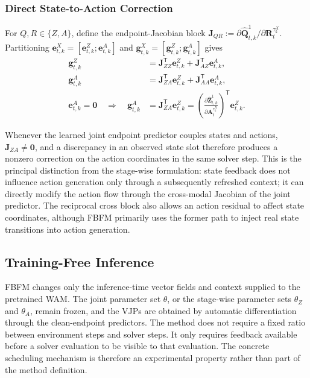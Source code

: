 \subsubsection{Direct State-to-Action Correction}

For $Q,R\in\{Z,A\}$, define the endpoint-Jacobian block
$\mathbf J_{QR}:=\partial\hat{\mathbf Q}_{t,k}^1/
\partial\mathbf R_t^{\tau_k^X}$. Partitioning
$\mathbf e_{t,k}^X=[\mathbf e_{t,k}^Z;\mathbf e_{t,k}^A]$ and
$\mathbf g_{t,k}^X=[\mathbf g_{t,k}^Z;\mathbf g_{t,k}^A]$ gives
\begin{equation}
    \begin{aligned}
    \mathbf g_{t,k}^Z
    &=\mathbf J_{ZZ}^{\mathsf T}\mathbf e_{t,k}^Z
      +\mathbf J_{AZ}^{\mathsf T}\mathbf e_{t,k}^A,\\
    \mathbf g_{t,k}^A
    &=\mathbf J_{ZA}^{\mathsf T}\mathbf e_{t,k}^Z
      +\mathbf J_{AA}^{\mathsf T}\mathbf e_{t,k}^A,\\
    \mathbf e_{t,k}^A=\mathbf 0
    \quad\Longrightarrow\quad
    \mathbf g_{t,k}^A
    &=\mathbf J_{ZA}^{\mathsf T}\mathbf e_{t,k}^Z
      =\left(\frac{\partial\hat{\mathbf Z}_{t,k}^1}
      {\partial\mathbf A_t^{\tau_k^X}}\right)^{\mathsf T}
      \mathbf e_{t,k}^Z.
    \end{aligned}
    \label{eq:direct-state-to-action-correction}
\end{equation}

Whenever the learned joint endpoint predictor couples states and actions,
$\mathbf J_{ZA}\neq\mathbf 0$, and a discrepancy in an observed state slot
therefore produces a nonzero correction on the action coordinates in the same
solver step. This is the principal distinction from the stage-wise formulation:
state feedback does not influence action generation only through a subsequently
refreshed context; it can directly modify the action flow through the cross-modal
Jacobian of the joint predictor. The reciprocal cross block also allows an action
residual to affect state coordinates, although FBFM primarily uses the former path
to inject real state transitions into action generation.


\subsection{Training-Free Inference}
\label{sec:method:training-free}

FBFM changes only the inference-time vector fields and context supplied to the
pretrained WAM. The joint parameter set $\theta$, or the stage-wise parameter sets
$\theta_Z$ and $\theta_A$, remain frozen, and the VJPs are obtained by automatic
differentiation through the clean-endpoint predictors.
The method does not require a fixed ratio between environment steps and solver
steps. It only requires feedback available before a solver evaluation to be visible
to that evaluation. The concrete scheduling mechanism is therefore an experimental
property rather than part of the method definition.
